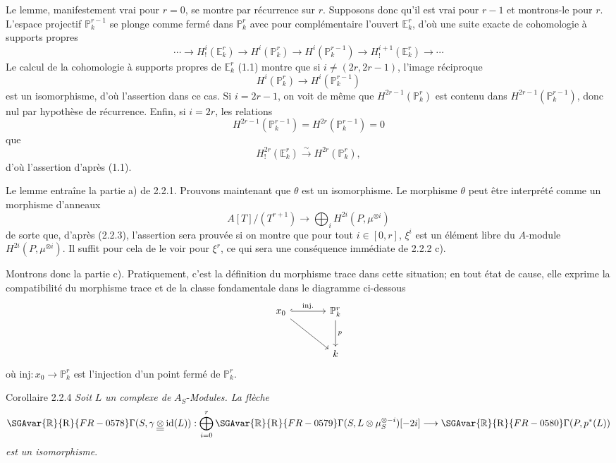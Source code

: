 Le lemme, manifestement vrai pour $r=0$, se montre par récurrence sur $r$. Supposons donc qu'il est vrai pour $r-1$ et montrons-le pour $r$. L'espace projectif $\mathbb{P}_k^{r-1}$ se plonge comme fermé dans $\mathbb{P}_k^r$ avec pour complémentaire l'ouvert $\mathbb{E}_k^r$, d'où une suite exacte de cohomologie à supports propres
\[
\cdots\longrightarrow H_!^i(\mathbb{E}_k^r)\longrightarrow H^i(\mathbb{P}_k^r)
\longrightarrow H^i(\mathbb{P}_k^{r-1})\longrightarrow H_!^{i+1}(\mathbb{E}_k^r)\longrightarrow\cdots
\]
Le calcul de la cohomologie à supports propres de $\mathbb{E}_k^r$ (1.1) montre que si $i\ne(2r,2r-1)$, l'image réciproque
\[
H^i(\mathbb{P}_k^r)\longrightarrow H^i(\mathbb{P}_k^{r-1})
\]
est un isomorphisme, d'où l'assertion dans ce cas. Si $i=2r-1$, on voit de même que $H^{2r-1}(\mathbb{P}_k^r)$ est contenu dans $H^{2r-1}(\mathbb{P}_k^{r-1})$, donc nul par hypothèse de récurrence. Enfin, si $i=2r$, les relations
\[
H^{2r-1}(\mathbb{P}_k^{r-1})=H^{2r}(\mathbb{P}_k^{r-1})=0
\]
 que
\[
H_!^{2r}(\mathbb{E}_k^r)\xrightarrow{\sim}H^{2r}(\mathbb{P}_k^r),
\]
d'où l'assertion d'après (1.1).

Le lemme entraîne la partie a) de 2.2.1. Prouvons maintenant que $\theta$ est un isomorphisme. Le morphisme $\theta$ peut être interprété comme un morphisme d'anneaux
\[
A[T]/(T^{r+1})\longrightarrow\bigoplus_i H^{2i}(P,\mu^{\otimes i})
\]
de
sorte que, d'après (2.2.3), l'assertion sera prouvée si on montre que pour tout $i\in[0,r]$, $\xi^i$ est un élément libre du $A$-module $H^{2i}(P,\mu^{\otimes i})$. Il suffit pour cela de le voir pour $\xi^r$, ce qui sera une conséquence immédiate de 2.2.2 c).

Montrons donc la partie c). Pratiquement, c'est la définition du morphisme trace dans cette situation; en tout état de cause, elle exprime la compatibilité du morphisme trace et de la classe fondamentale dans le diagramme ci-dessous
\[
\begin{tikzcd}[column sep=large,row sep=large]
x_0 \arrow[r,hook,"\mathrm{inj.}"] \arrow[dr] & \mathbb{P}^r_k \arrow[d,"p"]\\
& k
\end{tikzcd}
\]
où $\mathrm{inj}:x_0\to \mathbb{P}^r_k$ est l'injection d'un point fermé de $\mathbb{P}^r_k$.

\begin{statement}{Corollaire 2.2.4}
\emph{Soit} $L$ \emph{un complexe de} $A_S$-\emph{Modules. La flèche}
\[
\SGAvar{\mathbb{R}}{\mathrm{R}}{FR-0578}\Gamma(S,\gamma\mathbin{\underline{\underline{\otimes}}}\mathrm{id}(L)):
\bigoplus_{i=0}^r \SGAvar{\mathbb{R}}{\mathrm{R}}{FR-0579}\Gamma(S,L\otimes\mu_S^{\otimes -i})[-2i]
\longrightarrow
\SGAvar{\mathbb{R}}{\mathrm{R}}{FR-0580}\Gamma(P,p^*(L))
\]
\emph{est un isomorphisme}.
\end{statement}

